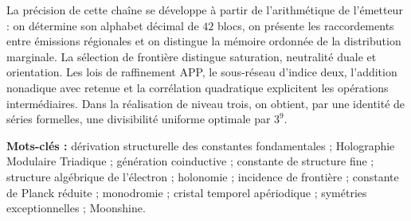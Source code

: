 \vspace{3pt}



La précision de cette chaîne se développe à partir de l'arithmétique de l'émetteur :
on détermine son alphabet décimal de \(42\) blocs, on présente les raccordements
entre émissions régionales et on distingue la mémoire ordonnée de la distribution
marginale. La sélection de frontière distingue saturation, neutralité duale
et orientation. Les lois de raffinement APP, le sous-réseau d'indice
deux, l'addition nonadique avec retenue et la corrélation quadratique explicitent
les opérations intermédiaires. Dans la réalisation de niveau trois, on obtient,
par une identité de séries formelles, une divisibilité uniforme
optimale par \(3^9\).

\noindent\textbf{Mots-clés :} dérivation structurelle des constantes fondamentales ;
Holographie Modulaire Triadique ; génération coinductive ; constante de structure fine ;
structure algébrique de l'électron ; holonomie ; incidence de frontière ;
constante de Planck réduite ; monodromie ; cristal temporel apériodique ;
symétries exceptionnelles ; Moonshine.
\par\endgroup
